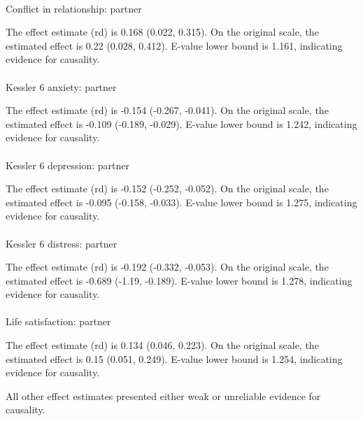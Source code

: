 \documentclass[
  single column]{article}
\makeatletter
\let\oldparagraph\paragraph
\renewcommand{\paragraph}{
    \@ifstar
      \xxxParagraphStar
      \xxxParagraphNoStar
  }
\newcommand{\xxxParagraphStar}[1]{\oldparagraph*{#1}\mbox{}}
\newcommand{\xxxParagraphNoStar}[1]{\oldparagraph{#1}\mbox{}}
\makeatother
\begin{document}
\paragraph{Conflict in relationship:
partner}\label{conflict-in-relationship-partner-2}

The effect estimate (rd) is 0.168 (0.022, 0.315). On the original scale,
the estimated effect is 0.22 (0.028, 0.412). E-value lower bound is
1.161, indicating evidence for causality.

\paragraph{Kessler 6 anxiety:
partner}\label{kessler-6-anxiety-partner-1}

The effect estimate (rd) is -0.154 (-0.267, -0.041). On the original
scale, the estimated effect is -0.109 (-0.189, -0.029). E-value lower
bound is 1.242, indicating evidence for causality.

\paragraph{Kessler 6 depression:
partner}\label{kessler-6-depression-partner}

The effect estimate (rd) is -0.152 (-0.252, -0.052). On the original
scale, the estimated effect is -0.095 (-0.158, -0.033). E-value lower
bound is 1.275, indicating evidence for causality.

\paragraph{Kessler 6 distress:
partner}\label{kessler-6-distress-partner}

The effect estimate (rd) is -0.192 (-0.332, -0.053). On the original
scale, the estimated effect is -0.689 (-1.19, -0.189). E-value lower
bound is 1.278, indicating evidence for causality.

\paragraph{Life satisfaction:
partner}\label{life-satisfaction-partner-2}

The effect estimate (rd) is 0.134 (0.046, 0.223). On the original scale,
the estimated effect is 0.15 (0.051, 0.249). E-value lower bound is
1.254, indicating evidence for causality.

All other effect estimates presented either weak or unreliable evidence
for causality.
\end{document}
